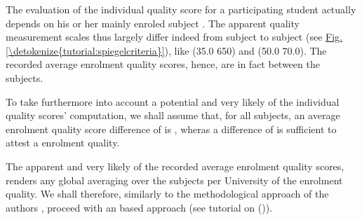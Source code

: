 \documentclass[a4paper,12pt,english]{sphinxhowto}
\begin{document}
The evaluation of the individual quality score for a participating student actually depends on his or her mainly enroled subject \sphinxfootnotemark[29]. The apparent quality measurement scales thus largely differ indeed from subject to subject (see \hyperref[\detokenize{tutorial:spiegelcriteria}]{Fig.\@ \ref{\detokenize{tutorial:spiegelcriteria}}}), like  (35.0 \sphinxhyphen{} 65\sphinxhyphen{}0) and  (50.0 \sphinxhyphen{} 70.0). The recorded average enrolment quality scores, hence, are in fact  between the subjects.

To take furthermore into account a potential and very likely  of the individual quality scores’ computation, we shall assume that, for all subjects, an average enrolment quality score difference of  is , wheras a difference of  is sufficient to  attest a  enrolment quality.

The apparent  and very likely  of the recorded average enrolment quality scores, renders  any global averaging over the subjects per University of the enrolment quality. We shall therefore, similarly to the methodological approach of the  authors \sphinxfootnotemark[29], proceed with an  based  approach (see tutorial on {\hyperref[\detokenize{tutorial:rating-tutorial-label}]{}} ()).
\end{document}
